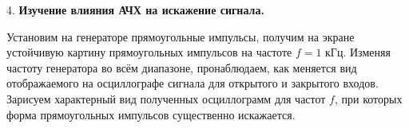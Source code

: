 \documentclass[14pt]{article}
\begin{document}
\vspace{0.5cm}
4. \textbf{Изучение влияния АЧХ на искажение сигнала.}

Установим на генераторе прямоугольные импульсы, получим на экране устойчивую картину прямоугольных импульсов на частоте $f = 1$ кГц. Изменяя частоту генератора во всём диапазоне, пронаблюдаем, как меняется вид отображаемого на осциллографе сигнала для открытого и закрытого входов. Зарисуем характерный вид полученных осциллограмм для частот $f$, при которых форма прямоугольных импульсов существенно искажается. 


\begin{figure}[h!]
	\label{fig:image}
\end{figure}
\begin{figure}[h!]
	\label{fig:image}
\end{figure}
\end{document}
